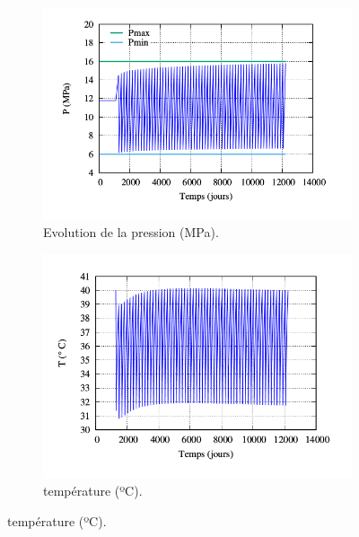 \documentclass[11pt,french,a4paper]{article}
\begin{document}
\begin{figure}[h!]
\centering

\begin{subfigure}[b]{0.4\linewidth}
    \includegraphics[width=\linewidth]{image/chap2/P1.png}
    \caption{Evolution de la pression (MPa).}
\end{subfigure}
\hspace{1cm}
\begin{subfigure}[b]{0.4\linewidth}
    \includegraphics[width=\linewidth]{image/chap2/T1.png}
    \caption{température (ºC).}
\end{subfigure}


\end{figure}
\end{document}
